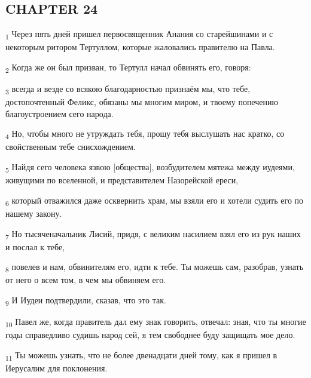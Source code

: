 \subsection{CHAPTER 24}
\begin{tcolorbox}
\textsubscript{1} Через пять дней пришел первосвященник Анания со старейшинами и с некоторым ритором Тертуллом, которые жаловались правителю на Павла.
\end{tcolorbox}
\begin{tcolorbox}
\textsubscript{2} Когда же он был призван, то Тертулл начал обвинять его, говоря:
\end{tcolorbox}
\begin{tcolorbox}
\textsubscript{3} всегда и везде со всякою благодарностью признаём мы, что тебе, достопочтенный Феликс, обязаны мы многим миром, и твоему попечению благоустроением сего народа.
\end{tcolorbox}
\begin{tcolorbox}
\textsubscript{4} Но, чтобы много не утруждать тебя, прошу тебя выслушать нас кратко, со свойственным тебе снисхождением.
\end{tcolorbox}
\begin{tcolorbox}
\textsubscript{5} Найдя сего человека язвою [общества], возбудителем мятежа между иудеями, живущими по вселенной, и представителем Назорейской ереси,
\end{tcolorbox}
\begin{tcolorbox}
\textsubscript{6} который отважился даже осквернить храм, мы взяли его и хотели судить его по нашему закону.
\end{tcolorbox}
\begin{tcolorbox}
\textsubscript{7} Но тысяченачальник Лисий, придя, с великим насилием взял его из рук наших и послал к тебе,
\end{tcolorbox}
\begin{tcolorbox}
\textsubscript{8} повелев и нам, обвинителям его, идти к тебе. Ты можешь сам, разобрав, узнать от него о всем том, в чем мы обвиняем его.
\end{tcolorbox}
\begin{tcolorbox}
\textsubscript{9} И Иудеи подтвердили, сказав, что это так.
\end{tcolorbox}
\begin{tcolorbox}
\textsubscript{10} Павел же, когда правитель дал ему знак говорить, отвечал: зная, что ты многие годы справедливо судишь народ сей, я тем свободнее буду защищать мое дело.
\end{tcolorbox}
\begin{tcolorbox}
\textsubscript{11} Ты можешь узнать, что не более двенадцати дней тому, как я пришел в Иерусалим для поклонения.
\end{tcolorbox}
